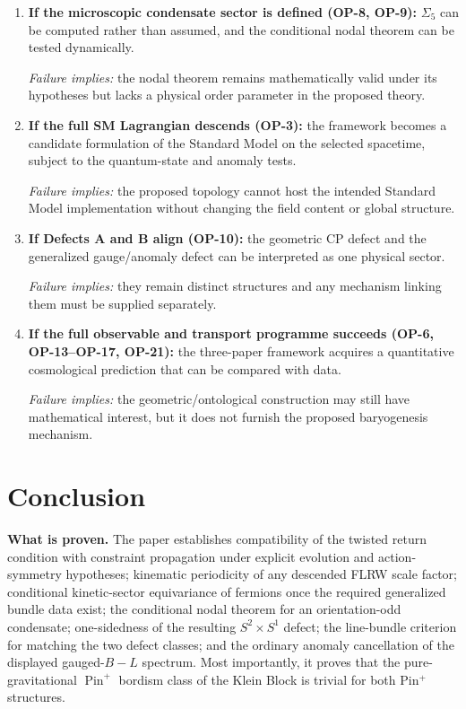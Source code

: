 \documentclass[11pt]{article}
\theoremstyle{canonmath}
\theoremstyle{canonpostulate}
\theoremstyle{canonclaim}
\providecommand{\Pin}{\operatorname{Pin}}
\begin{document}
\begin{enumerate}
\item \textbf{If the microscopic condensate sector is defined (OP-8, OP-9):} $\Sigma_5$ can be computed rather than assumed, and the conditional nodal theorem can be tested dynamically.

\emph{Failure implies:} the nodal theorem remains mathematically valid under its hypotheses but lacks a physical order parameter in the proposed theory.

\item \textbf{If the full SM Lagrangian descends (OP-3):} the framework becomes a candidate formulation of the Standard Model on the selected spacetime, subject to the quantum-state and anomaly tests.

\emph{Failure implies:} the proposed topology cannot host the intended Standard Model implementation without changing the field content or global structure.

\item \textbf{If Defects A and B align (OP-10):} the geometric CP defect and the generalized gauge/anomaly defect can be interpreted as one physical sector.

\emph{Failure implies:} they remain distinct structures and any mechanism linking them must be supplied separately.

\item \textbf{If the full observable and transport programme succeeds (OP-6, OP-13--OP-17, OP-21):} the three-paper framework acquires a quantitative cosmological prediction that can be compared with data.

\emph{Failure implies:} the geometric/ontological construction may still have mathematical interest, but it does not furnish the proposed baryogenesis mechanism.
\end{enumerate}

\section{Conclusion}

\textbf{What is proven.} The paper establishes compatibility of the twisted return condition with constraint propagation under explicit evolution and action-symmetry hypotheses; kinematic periodicity of any descended FLRW scale factor; conditional kinetic-sector equivariance of fermions once the required generalized bundle data exist; the conditional nodal theorem for an orientation-odd condensate; one-sidedness of the resulting $S^2\times S^1$ defect; the line-bundle criterion for matching the two defect classes; and the ordinary anomaly cancellation of the displayed gauged-$B-L$ spectrum. Most importantly, it proves that the pure-gravitational $\Pin^+$ bordism class of the Klein Block is trivial for both Pin$^+$ structures.
\end{document}
